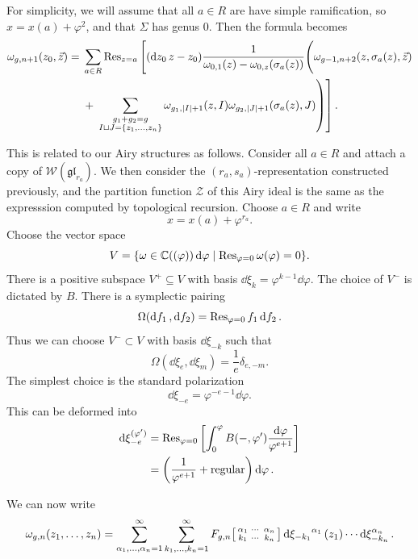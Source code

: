 \documentclass[leqno, openany]{memoir}
\theoremstyle{definition}
\theoremstyle{remark}
\theoremstyle{plain}
\theoremstyle{definition}
\theoremstyle{remark}
\newcommand{\C}{\mathbb{C}}
\newcommand{\mc}[1]{\mathcal{#1}}
\newcommand{\mf}[1]{\mathfrak{#1}}
\newcommand{\mr}[1]{\mathrm{#1}}
\begin{document}
For simplicity, we will assume that all $a \in R$ are have simple ramification, so $x = x(a) + \varphi^2$, and that $\Sigma$ has genus $0$. Then the formula becomes
\[
\begin{split}
    \omega_{g, n+1}(z_0, \vec{z}) ={} &\sum_{a \in R} \Res_{z = a}\Bigg[\qty(\dd{z_0}{z-z_0}) \frac{1}{\omega_{0,1}(z) - \omega_{0,z}(\sigma_a(z))} \Bigg(\omega_{g-1, n+2}(z, \sigma_a(z), \vec{z})  \\ 
    &+ \left. \left. \sum_{\substack{g_1+g_2=g \\ I \sqcup J = \qty{z_1,\ldots,z_n}}} \omega_{g_1, \abs{I}+1}(z, I) \omega_{g_2, \abs{J}+1}(\sigma_a(z), J)\right)\right].
\end{split}
\]

This is related to our Airy structures as follows. Consider all $a \in R$ and attach a copy of $\mc{W}(\mf{gl}_{r_a})$. We then consider the $(r_a, s_a)$-representation constructed previously, and the partition function $\mc{Z}$ of this Airy ideal is the same as the expresssion computed by topological recursion. Choose $a \in R$ and write
\[ x = x(a) + \varphi^{r_a}. \]
Choose the vector space
\[ V = \qty{\omega \in \C((\varphi)) \dd{\varphi} \mid \Res_{\varphi=0} \omega(\varphi) = 0}. \]
There is a positive subspace $V^+ \subseteq V$ with basis $\dd{\xi_k} = \varphi^{k-1} \dd{\varphi}$. The choice of $V^-$ is dictated by $B$. There is a symplectic pairing
\[ \Omega(\dd{f_1}, \dd{f_2}) = \Res_{\varphi = 0} f_1 \dd{f_2}. \]
Thus we can choose $V^- \subset V$ with basis $\dd{\xi_{-k}}$ such that
\[ \Omega(\dd{\xi_e}, \dd{\xi_m}) = \frac{1}{e} \delta_{e, -m}. \]
The simplest choice is the standard polarization
\[ \dd{\xi_{-e}} = \varphi^{-e-1} \dd{\varphi}. \]
This can be deformed into
\begin{align*}
    \dd{\xi_{-e}^{(\varphi')}} &= \Res_{\varphi=0} \qty[\int_0^{\varphi} B(-, \varphi') \frac{\dd{\varphi}}{\varphi^{e+1}}] \\
    &= \qty(\frac{1}{\varphi^{e+1}} + \mr{regular}) \dd{\varphi}.
\end{align*}

We can now write
\[ \omega_{g, n}(z_1, \ldots, z_n) = \sum_{\alpha_1, \ldots, \alpha_n=1}^{\infty} \sum_{k_1, \ldots, k_n = 1}^{\infty} F_{g,n}
\begin{bsmallmatrix}
    \alpha_1 & \cdots & \alpha_n \\
    k_1 & \cdots & k_n
\end{bsmallmatrix} \dd{\xi_{-k_1}}^{\alpha_1}(z_1) \cdots \dd{\xi_{-k_n}^{\alpha_n}}.
\]
\end{document}
